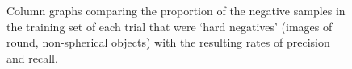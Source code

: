 \documentclass{sig-alternate-05-2015}
\begin{document}
{		%

    \begin{figure}
      \centering
      \qquad
      \caption{Column graphs comparing the proportion of the negative samples in the training set of each trial that were `hard negatives' (images of round, non-spherical objects) with the resulting rates of precision and recall.}
      \label{fig:trial_comparison_charts}
    \end{figure}

}
\end{document}
